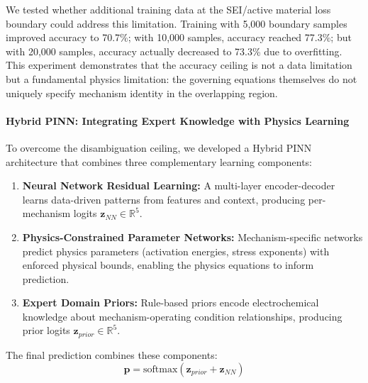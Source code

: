 \documentclass[5p,times,authoryear]{elsarticle}
\begin{document}
We tested whether additional training data at the SEI/active material loss boundary could address this limitation. Training with 5,000 boundary samples improved accuracy to 70.7\%; with 10,000 samples, accuracy reached 77.3\%; but with 20,000 samples, accuracy actually decreased to 73.3\% due to overfitting. This experiment demonstrates that the accuracy ceiling is not a data limitation but a fundamental physics limitation: the governing equations themselves do not uniquely specify mechanism identity in the overlapping region.

\paragraph{Hybrid PINN: Integrating Expert Knowledge with Physics Learning}

To overcome the disambiguation ceiling, we developed a Hybrid PINN architecture that combines three complementary learning components:

\begin{enumerate}
    \item \textbf{Neural Network Residual Learning:} A multi-layer encoder-decoder learns data-driven patterns from features and context, producing per-mechanism logits $\mathbf{z}_{NN} \in \mathbb{R}^5$.
    
    \item \textbf{Physics-Constrained Parameter Networks:} Mechanism-specific networks predict physics parameters (activation energies, stress exponents) with enforced physical bounds, enabling the physics equations to inform prediction.
    
    \item \textbf{Expert Domain Priors:} Rule-based priors encode electrochemical knowledge about mechanism-operating condition relationships, producing prior logits $\mathbf{z}_{prior} \in \mathbb{R}^5$.
\end{enumerate}

The final prediction combines these components:
\begin{equation}
\mathbf{p} = \text{softmax}(\mathbf{z}_{prior} + \mathbf{z}_{NN})
\label{eq:hybrid_combination}
\end{equation}
\end{document}
